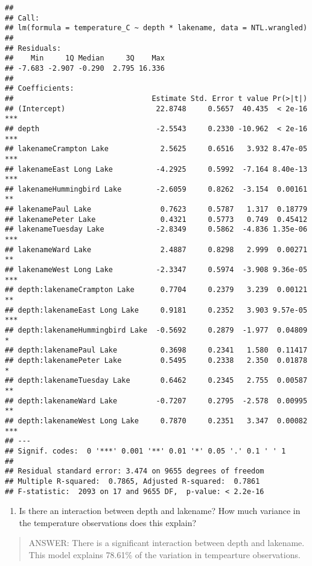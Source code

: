 \documentclass[]{article}
\providecommand{\tightlist}{%
  \setlength{\itemsep}{0pt}\setlength{\parskip}{0pt}}
\begin{document}
\begin{verbatim}
## 
## Call:
## lm(formula = temperature_C ~ depth * lakename, data = NTL.wrangled)
## 
## Residuals:
##    Min     1Q Median     3Q    Max 
## -7.683 -2.907 -0.290  2.795 16.336 
## 
## Coefficients:
##                                Estimate Std. Error t value Pr(>|t|)    
## (Intercept)                     22.8748     0.5657  40.435  < 2e-16 ***
## depth                           -2.5543     0.2330 -10.962  < 2e-16 ***
## lakenameCrampton Lake            2.5625     0.6516   3.932 8.47e-05 ***
## lakenameEast Long Lake          -4.2925     0.5992  -7.164 8.40e-13 ***
## lakenameHummingbird Lake        -2.6059     0.8262  -3.154  0.00161 ** 
## lakenamePaul Lake                0.7623     0.5787   1.317  0.18779    
## lakenamePeter Lake               0.4321     0.5773   0.749  0.45412    
## lakenameTuesday Lake            -2.8349     0.5862  -4.836 1.35e-06 ***
## lakenameWard Lake                2.4887     0.8298   2.999  0.00271 ** 
## lakenameWest Long Lake          -2.3347     0.5974  -3.908 9.36e-05 ***
## depth:lakenameCrampton Lake      0.7704     0.2379   3.239  0.00121 ** 
## depth:lakenameEast Long Lake     0.9181     0.2352   3.903 9.57e-05 ***
## depth:lakenameHummingbird Lake  -0.5692     0.2879  -1.977  0.04809 *  
## depth:lakenamePaul Lake          0.3698     0.2341   1.580  0.11417    
## depth:lakenamePeter Lake         0.5495     0.2338   2.350  0.01878 *  
## depth:lakenameTuesday Lake       0.6462     0.2345   2.755  0.00587 ** 
## depth:lakenameWard Lake         -0.7207     0.2795  -2.578  0.00995 ** 
## depth:lakenameWest Long Lake     0.7870     0.2351   3.347  0.00082 ***
## ---
## Signif. codes:  0 '***' 0.001 '**' 0.01 '*' 0.05 '.' 0.1 ' ' 1
## 
## Residual standard error: 3.474 on 9655 degrees of freedom
## Multiple R-squared:  0.7865, Adjusted R-squared:  0.7861 
## F-statistic:  2093 on 17 and 9655 DF,  p-value: < 2.2e-16
\end{verbatim}

\begin{enumerate}
\def\labelenumi{\arabic{enumi}.}
\setcounter{enumi}{14}
\tightlist
\item
  Is there an interaction between depth and lakename? How much variance
  in the temperature observations does this explain?
\end{enumerate}

\begin{quote}
ANSWER: There is a significant interaction between depth and lakename.
This model explains 78.61\% of the variation in tempearture
observations.
\end{quote}
\end{document}
